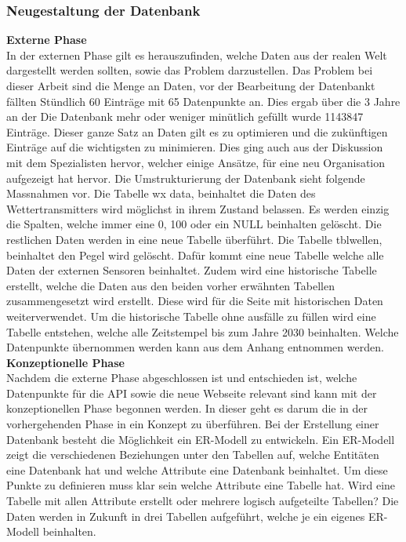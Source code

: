 \subsubsection{Neugestaltung der Datenbank}
\textbf{Externe Phase}\\
In der externen Phase gilt es herauszufinden, welche Daten aus der realen Welt dargestellt werden sollten, sowie das Problem darzustellen. Das Problem bei dieser Arbeit sind die Menge an Daten, vor der Bearbeitung der Datenbankt fällten Stündlich 60 Einträge mit 65 Datenpunkte an. Dies ergab über die 3 Jahre an der Die Datenbank mehr oder weniger minütlich gefüllt wurde 1143847 Einträge. Dieser ganze Satz an Daten gilt es zu optimieren und die zukünftigen Einträge auf die wichtigsten zu minimieren. Dies ging auch aus der Diskussion mit dem Spezialisten hervor, welcher einige Ansätze, für eine neu Organisation aufgezeigt hat hervor. Die Umstrukturierung der Datenbank sieht folgende Massnahmen vor. Die Tabelle wx data, beinhaltet die Daten des Wettertransmitters wird möglichst in ihrem Zustand belassen. Es werden einzig die Spalten, welche immer eine 0, 100 oder ein NULL beinhalten gelöscht. Die restlichen Daten werden in eine neue Tabelle überführt. Die Tabelle tblwellen, beinhaltet den Pegel wird gelöscht. Dafür kommt eine neue Tabelle welche alle Daten der externen Sensoren beinhaltet. Zudem wird eine historische Tabelle erstellt, welche die Daten aus den beiden vorher erwähnten Tabellen zusammengesetzt wird erstellt. Diese wird für die Seite mit historischen Daten weiterverwendet. Um die historische Tabelle ohne ausfälle zu füllen wird eine Tabelle entstehen, welche alle Zeitstempel bis zum Jahre 2030 beinhalten. Welche Datenpunkte übernommen werden kann aus dem Anhang  entnommen werden.\\

\textbf{Konzeptionelle Phase}\\
Nachdem die externe Phase abgeschlossen ist und entschieden ist, welche Datenpunkte für die API sowie die neue Webseite relevant sind kann mit der konzeptionellen Phase begonnen werden. In dieser geht es darum die in der vorhergehenden Phase in ein Konzept zu überführen. Bei der Erstellung einer Datenbank besteht die Möglichkeit ein ER-Modell zu entwickeln. Ein ER-Modell zeigt die verschiedenen Beziehungen unter den Tabellen auf, welche Entitäten eine Datenbank hat und welche Attribute eine Datenbank beinhaltet.\cite{FrankGeisler2011mitpu} Um diese Punkte zu definieren muss klar sein welche Attribute eine Tabelle hat. Wird eine Tabelle mit allen Attribute erstellt oder mehrere logisch aufgeteilte Tabellen? Die Daten werden in Zukunft in drei Tabellen aufgeführt, welche je ein eigenes ER-Modell beinhalten.\\

